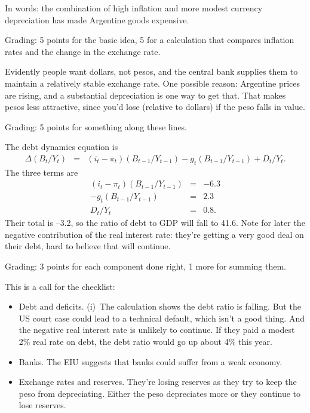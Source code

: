 \documentclass[letterpaper,12pt]{exam}
\begin{document}
\begin{questions}
\begin{solution}
\begin{parts}
In words:  the combination of high inflation and 
more modest currency depreciation has made Argentine goods expensive. 

Grading:  5 points for the basic idea, 5 for a calculation that compares
inflation rates and the change in the exchange rate.  

\item Evidently people want dollars, not pesos, and the central bank supplies
them to maintain a relatively stable exchange rate.  
One possible reason:  Argentine prices are rising, 
and a substantial depreciation is one way to get that. 
That makes pesos less attractive, since you'd lose (relative to dollars)
if the peso falls in value.  

Grading:  5 points for something along these lines.  

\item The debt dynamics equation is
\begin{eqnarray*}
   \Delta (B_t/Y_t)  &=&  (i_t - \pi_t)(B_{t-1}/Y_{t-1})
                - g_t (B_{t-1}/Y_{t-1}) + D_t/Y_t .
\end{eqnarray*}
The three terms are
\begin{eqnarray*}
    (i_t - \pi_t)(B_{t-1}/Y_{t-1}) &=&  -6.3  \\
    - g_t (B_{t-1}/Y_{t-1})   &=&  2.3 \\
    D_t/Y_t  &=&  0.8 .
\end{eqnarray*}
Their total is --3.2, so the ratio of debt to GDP will fall to 41.6. 
Note for later the negative contribution of the real interest rate:
they're getting a very good deal on their debt, hard to believe that will 
continue.   

Grading:  3 points for each component done right, 1 more for summing them.

\item This is a call for the checklist:
\begin{itemize}
\item Debt and deficits.
(i)~The calculation shows the debt ratio is falling.
But the US court case could lead to a technical default, 
which isn't a good thing.  
And the negative real interest rate is unlikely to continue. 
If they paid a modest 2\% real rate on debt, the debt ratio would 
go up about 4\% this year.  

\item Banks.
The EIU suggests that banks could suffer from a weak economy.  

\item Exchange rates and reserves.  
They're losing reserves as they try to keep the peso 
from depreciating.  
Either the peso depreciates more or they continue to lose reserves.  


\end{itemize}
\end{parts}
\end{solution}
\end{questions}
\end{document}
